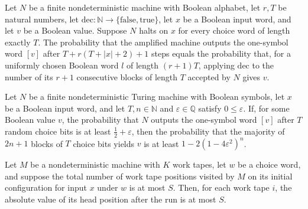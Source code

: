 \begin{theorem}
\label{Randomized.Amplify.amp_outputProb}
\leanok
{}
Let $N$ be a finite nondeterministic machine with Boolean alphabet, let $r,T$ be natural
numbers, let $\mathrm{dec}:\mathbb{N}\to\{\mathrm{false},\mathrm{true}\}$, let $x$ be a
Boolean input word, and let $v$ be a Boolean value. Suppose $N$ halts on $x$ for every
choice word of length exactly $T$. The probability that the amplified machine outputs
the one-symbol word $[v]$ after $T+r(T+|x|+2)+1$ steps equals the probability that, for
a uniformly chosen Boolean word $l$ of length $(r+1)T$, applying $\mathrm{dec}$ to the
number of its $r+1$ consecutive blocks of length $T$ accepted by $N$ gives $v$.
\end{theorem}

\begin{theorem}
\label{Randomized.Amplify.majority_randProb_ge}
\leanok
{}
Let $N$ be a finite nondeterministic Turing machine with Boolean symbols, let $x$ be a
Boolean input word, and let $T,n\in\mathbb{N}$ and $\varepsilon\in\mathbb{Q}$ satisfy
$0\leq\varepsilon$. If, for some Boolean value $v$, the probability that $N$ outputs the
one-symbol word $[v]$ after $T$ random choice bits is at least $\frac12+\varepsilon$,
then the probability that the majority of $2n+1$ blocks of $T$ choice bits yields $v$ is
at least $1-2(1-4\varepsilon^2)^n$.
\end{theorem}

\begin{theorem}
\label{Randomized.Amplify.abs_workTapePos_le}
\leanok
{}
Let $M$ be a nondeterministic machine with $K$ work tapes, let $w$ be a choice word, and
suppose the total number of work tape positions visited by $M$ on its initial
configuration for input $x$ under $w$ is at most $S$. Then, for each work tape $i$, the
absolute value of its head position after the run is at most $S$.
\end{theorem}

